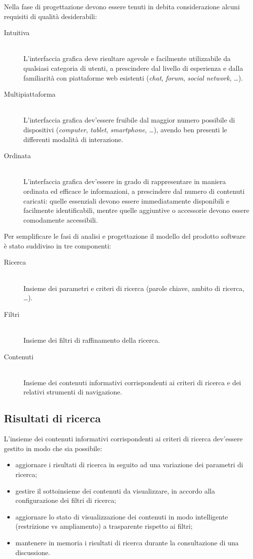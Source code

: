 Nella fase di progettazione devono essere tenuti in debita considerazione alcuni requisiti di qualità desiderabili:
\begin{description}
	\item[Intuitiva] \hfill \\
	L'interfaccia grafica deve risultare agevole e facilmente utilizzabile da qualsiasi categoria di utenti, a prescindere dal livello di esperienza e dalla familiarità con piattaforme web esistenti (\textit{chat}, \textit{forum}, \textit{social network}, \ldots).
	\item[Multipiattaforma] \hfill \\
	L'interfaccia grafica dev'essere fruibile dal maggior numero possibile di dispositivi (\textit{computer}, \textit{tablet}, \textit{smartphone}, \ldots), avendo ben presenti le differenti modalità di interazione.
	\item[Ordinata] \hfill \\
	L'interfaccia grafica dev'essere in grado di rappresentare in maniera ordinata ed efficace le informazioni, a prescindere dal numero di contenuti caricati: quelle essenziali devono essere immediatamente disponibili e facilmente identificabili, mentre quelle aggiuntive o accessorie devono essere comodamente accessibili.
\end{description}

Per semplificare le fasi di analisi e progettazione il modello del prodotto software è stato suddiviso in tre componenti:
\begin{description}
 	\item[Ricerca] \hfill \\
 	Insieme dei parametri e criteri di ricerca (parole chiave, ambito di ricerca, \ldots).
 	\item[Filtri] \hfill \\
 	Insieme dei filtri di raffinamento della ricerca.
 	\item[Contenuti] \hfill \\
 	Insieme dei contenuti informativi corrispondenti ai criteri di ricerca e dei relativi strumenti di navigazione.
 \end{description}
 
\subsection{Risultati di ricerca}
L'insieme dei contenuti informativi corrispondenti ai criteri di ricerca dev'essere gestito in modo che sia possibile:
\begin{itemize}
	\item aggiornare i risultati di ricerca in seguito ad una variazione dei parametri di ricerca;
	\item gestire il sottoinsieme dei contenuti da visualizzare, in accordo alla configurazione dei filtri di ricerca;
	\item aggiornare lo stato di visualizzazione dei contenuti in modo intelligente (restrizione vs ampliamento) a trasparente rispetto ai filtri;
	\item mantenere in memoria i risultati di ricerca durante la consultazione di una discussione.
\end{itemize}

